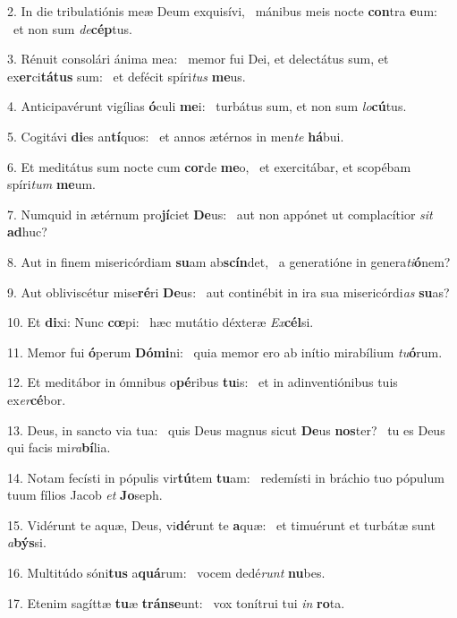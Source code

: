 2. In die tribulatiónis meæ Deum exquisívi, \dag\  mánibus meis nocte \textbf{con}tra \textbf{e}um: \ast\  et non sum \textit{de}\textbf{cép}tus.\

3. Rénuit consolári ánima mea: \dag\  memor fui Dei, et delectátus sum, et ex\textbf{er}ci\textbf{tá}\textbf{tus} sum: \ast\  et defécit spíri\textit{tus} \textbf{me}us.\

4. Anticipavérunt vigílias \textbf{ó}culi \textbf{me}i: \ast\  turbátus sum, et non sum \textit{lo}\textbf{cú}tus.\

5. Cogitávi \textbf{di}es an\textbf{tí}quos: \ast\  et annos ætérnos in men\textit{te} \textbf{há}bui.\

6. Et meditátus sum nocte cum \textbf{cor}de \textbf{me}o, \ast\  et exercitábar, et scopébam spíri\textit{tum} \textbf{me}um.\

7. Numquid in ætérnum pro\textbf{jí}ciet \textbf{De}us: \ast\  aut non appónet ut complacítior \textit{sit} \textbf{ad}huc?\

8. Aut in finem misericórdiam \textbf{su}am ab\textbf{scín}det, \ast\  a generatióne in genera\textit{ti}\textbf{ó}nem?\

9. Aut obliviscétur mise\textbf{ré}ri \textbf{De}us: \ast\  aut continébit in ira sua misericórdi\textit{as} \textbf{su}as?\

10. Et \textbf{di}xi: Nunc \textbf{cœ}pi: \ast\  hæc mutátio déxteræ \textit{Ex}\textbf{cél}si.\

11. Memor fui \textbf{ó}perum \textbf{Dó}\textbf{mi}ni: \ast\  quia memor ero ab inítio mirabílium \textit{tu}\textbf{ó}rum.\

12. Et meditábor in ómnibus o\textbf{pé}ribus \textbf{tu}is: \ast\  et in adinventiónibus tuis ex\textit{er}\textbf{cé}bor.\

13. Deus, in sancto via tua: \dag\  quis Deus magnus sicut \textbf{De}us \textbf{nos}ter? \ast\  tu es Deus qui facis mi\textit{ra}\textbf{bí}lia.\

14. Notam fecísti in pópulis vir\textbf{tú}tem \textbf{tu}am: \ast\  redemísti in bráchio tuo pópulum tuum fílios Jacob \textit{et} \textbf{Jo}seph.\

15. Vidérunt te aquæ, Deus, vi\textbf{dé}runt te \textbf{a}quæ: \ast\  et timuérunt et turbátæ sunt \textit{a}\textbf{býs}si.\

16. Multitúdo sóni\textbf{tus} a\textbf{quá}rum: \ast\  vocem dedé\textit{runt} \textbf{nu}bes.\

17. Etenim sagíttæ \textbf{tu}æ \textbf{tráns}\textbf{e}unt: \ast\  vox tonítrui tui \textit{in} \textbf{ro}ta.\


